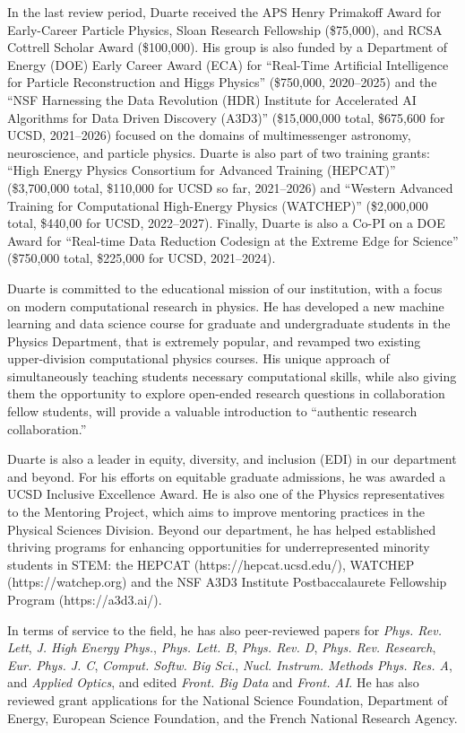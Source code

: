 \documentclass[11pt]{article}
\begin{document}
In the last review period, Duarte received the APS Henry Primakoff Award for Early-Career Particle Physics, Sloan Research Fellowship (\$75,000), and RCSA Cottrell Scholar Award (\$100,000).
His group is also funded by a Department of Energy (DOE) Early Career Award (ECA) for ``Real-Time Artificial Intelligence for Particle Reconstruction and Higgs Physics'' (\$750,000, 2020--2025) and the ``NSF Harnessing the Data Revolution (HDR) Institute for Accelerated AI Algorithms for Data Driven Discovery (A3D3)'' (\$15,000,000 total, \$675,600 for UCSD, 2021--2026) focused on the domains of multimessenger astronomy, neuroscience, and particle physics.
Duarte is also part of two training grants: ``High Energy Physics Consortium for Advanced Training (HEPCAT)'' (\$3,700,000 total, \$110,000 for UCSD so far, 2021--2026) and ``Western Advanced Training for Computational High-Energy Physics (WATCHEP)'' (\$2,000,000 total, \$440,00 for UCSD, 2022--2027).
Finally, Duarte is also a Co-PI on a DOE Award for ``Real-time Data Reduction Codesign at the Extreme Edge for Science'' (\$750,000 total, \$225,000 for UCSD, 2021--2024).

Duarte is committed to the educational mission of our institution, with a focus on modern computational research in physics.
He has developed a new machine learning and data science course for graduate and undergraduate students in the Physics Department, that is extremely popular, and revamped two existing upper-division computational physics courses.
His unique approach of simultaneously teaching students necessary computational skills, while also giving them the opportunity to explore open-ended research questions in collaboration fellow students, will provide a valuable introduction to ``authentic research collaboration.''

Duarte is also a leader in equity, diversity, and inclusion (EDI) in our department and beyond.
For his efforts on equitable graduate admissions, he was awarded a UCSD Inclusive Excellence Award.
He is also one of the Physics representatives to the Mentoring Project, which aims to improve mentoring practices in the Physical Sciences Division.
Beyond our department, he has helped established thriving programs for enhancing opportunities for underrepresented minority students in STEM: the HEPCAT (https://hepcat.ucsd.edu/), WATCHEP (https://watchep.org) and the NSF A3D3 Institute Postbaccalaurete Fellowship Program (https://a3d3.ai/).

In terms of service to the field, he has also peer-reviewed papers for \emph{Phys. Rev. Lett}, \emph{J. High Energy Phys.}, \emph{Phys. Lett. B}, \emph{Phys. Rev. D}, \emph{Phys. Rev. Research}, \emph{Eur. Phys. J. C}, \emph{Comput. Softw. Big Sci.}, \emph{Nucl. Instrum. Methods Phys. Res. A}, and \emph{Applied Optics}, and edited \emph{Front. Big Data} and \emph{Front. AI}.
He has also reviewed grant applications for the National Science Foundation, Department of Energy, European Science Foundation, and the French National Research Agency.
\end{document}
